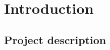 \chapter{Introduction}


\section{Project description}
\label{sec:project-description} 
\cite{sintefnotat}
